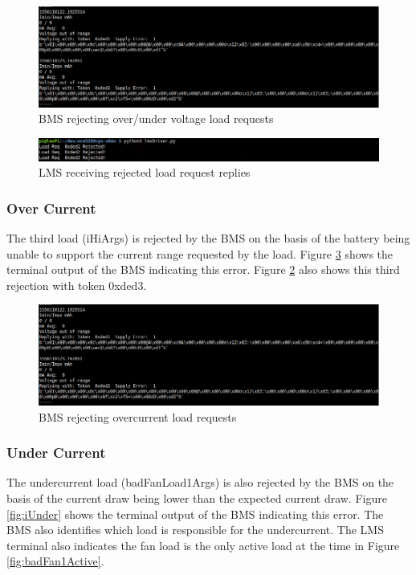 \documentclass[11pt,conference,draftcls,onecolumn]{IEEEtran}
\begin{document}
\begin{figure}[!htbp]
    \centering
    \includegraphics[width=6.5in]{img/vOutOfRange.png}
    \caption{BMS rejecting over/under voltage load requests}
    \label{fig:vOutOfRange}
\end{figure}
\begin{figure}[!htbp]
    \centering
    \includegraphics[width=6.5in]{img/lmsRejected.png}
    \caption{LMS receiving rejected load request replies}
    \label{fig:lmsRejected}
\end{figure}

\subsubsection{Over Current}
The third load (iHiArgs) is rejected by the BMS on the basis of the battery being unable to support the current range requested by the load.
Figure \ref{fig:iOutOfRange} shows the terminal output of the BMS indicating this error.
Figure \ref{fig:lmsRejected} also shows this third rejection with token 0xded3.

\begin{figure}[!htbp]
    \centering
    \includegraphics[width=6.5in]{img/vOutOfRange.png}
    \caption{BMS rejecting overcurrent load requests}
    \label{fig:iOutOfRange}
\end{figure}

\subsubsection{Under Current}
The undercurrent load (badFanLoad1Args) is also rejected by the BMS on the basis of the current draw being lower than the expected current draw.
Figure \ref{fig:iUnder} shows the terminal output of the BMS indicating this error.
The BMS also identifies which load is responsible for the undercurrent.
The LMS terminal also indicates the fan load is the only active load at the time in Figure \ref{fig:badFan1Active}.
\end{document}
